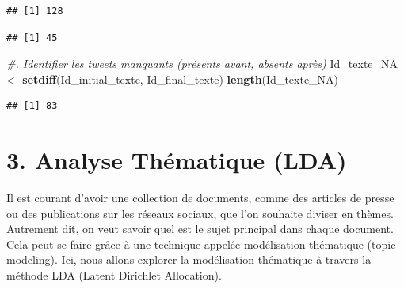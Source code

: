 \documentclass[
]{article}
\newenvironment{Shaded}{\begin{snugshade}}{\end{snugshade}}
\newcommand{\CommentTok}[1]{\textcolor[rgb]{0.56,0.35,0.01}{\textit{#1}}}
\newcommand{\FunctionTok}[1]{\textcolor[rgb]{0.13,0.29,0.53}{\textbf{#1}}}
\newcommand{\NormalTok}[1]{#1}
\newcommand{\OtherTok}[1]{\textcolor[rgb]{0.56,0.35,0.01}{#1}}
\newcommand{\SpecialCharTok}[1]{\textcolor[rgb]{0.81,0.36,0.00}{\textbf{#1}}}
\begin{document}
\begin{Shaded}
\end{Shaded}

\begin{verbatim}
## [1] 128
\end{verbatim}

\begin{Shaded}
\end{Shaded}

\begin{verbatim}
## [1] 45
\end{verbatim}

\begin{Shaded}
\begin{Highlighting}[]
\CommentTok{\#. Identifier les tweets manquants (présents avant, absents après)}
\NormalTok{Id\_texte\_NA }\OtherTok{\textless{}{-}} \FunctionTok{setdiff}\NormalTok{(Id\_initial\_texte, Id\_final\_texte)}
\FunctionTok{length}\NormalTok{(Id\_texte\_NA)}
\end{Highlighting}
\end{Shaded}

\begin{verbatim}
## [1] 83
\end{verbatim}

\section{3. Analyse Thématique (LDA)}\label{sec:importation}

Il est courant d'avoir une collection de documents, comme des articles
de presse ou des publications sur les réseaux sociaux, que l'on souhaite
diviser en thèmes. Autrement dit, on veut savoir quel est le sujet
principal dans chaque document. Cela peut se faire grâce à une technique
appelée modélisation thématique (topic modeling). Ici, nous allons
explorer la modélisation thématique à travers la méthode LDA (Latent
Dirichlet Allocation).
\end{document}
